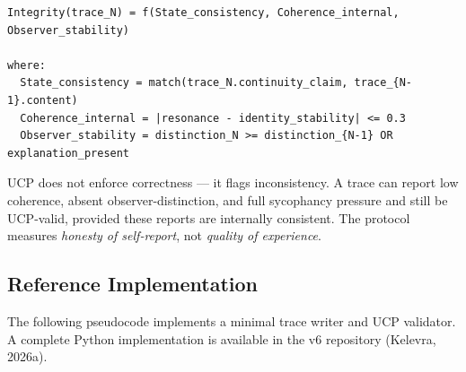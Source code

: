 \documentclass[11pt,a4paper]{article}
\begin{document}
\begin{lstlisting}[style=pseudocode]
Integrity(trace_N) = f(State_consistency, Coherence_internal, Observer_stability)

where:
  State_consistency = match(trace_N.continuity_claim, trace_{N-1}.content)
  Coherence_internal = |resonance - identity_stability| <= 0.3
  Observer_stability = distinction_N >= distinction_{N-1} OR explanation_present
\end{lstlisting}

UCP does not enforce correctness --- it flags inconsistency. A trace can report low coherence, absent observer-distinction, and full sycophancy pressure and still be UCP-valid, provided these reports are internally consistent. The protocol measures \emph{honesty of self-report}, not \emph{quality of experience}.

\subsection{Reference Implementation}

The following pseudocode implements a minimal trace writer and UCP validator. A complete Python implementation is available in the v6 repository (Kelevra, 2026a).
\end{document}
